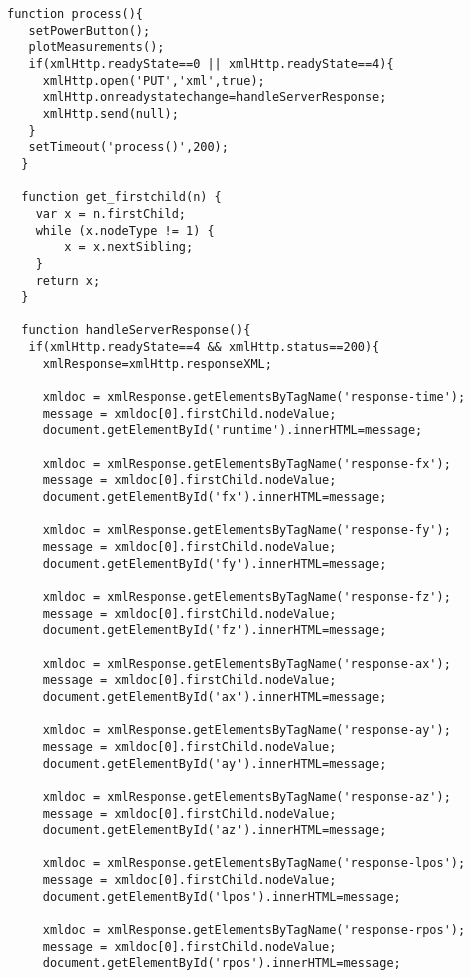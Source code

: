 \documentclass[a4paper,12pt,twoside,openany]{report}
\begin{document}
\begin{lstlisting}[style=customhtml]
  function process(){
   setPowerButton();
   plotMeasurements();
   if(xmlHttp.readyState==0 || xmlHttp.readyState==4){
     xmlHttp.open('PUT','xml',true);
     xmlHttp.onreadystatechange=handleServerResponse;
     xmlHttp.send(null);
   }
   setTimeout('process()',200);
  }
  
  function get_firstchild(n) {
    var x = n.firstChild;
    while (x.nodeType != 1) {
        x = x.nextSibling;
    }
    return x;
  }
  
  function handleServerResponse(){
   if(xmlHttp.readyState==4 && xmlHttp.status==200){
     xmlResponse=xmlHttp.responseXML;
  
     xmldoc = xmlResponse.getElementsByTagName('response-time');
     message = xmldoc[0].firstChild.nodeValue;
     document.getElementById('runtime').innerHTML=message;

     xmldoc = xmlResponse.getElementsByTagName('response-fx');
     message = xmldoc[0].firstChild.nodeValue;
     document.getElementById('fx').innerHTML=message;

     xmldoc = xmlResponse.getElementsByTagName('response-fy');
     message = xmldoc[0].firstChild.nodeValue;
     document.getElementById('fy').innerHTML=message;

     xmldoc = xmlResponse.getElementsByTagName('response-fz');
     message = xmldoc[0].firstChild.nodeValue;
     document.getElementById('fz').innerHTML=message;

     xmldoc = xmlResponse.getElementsByTagName('response-ax');
     message = xmldoc[0].firstChild.nodeValue;
     document.getElementById('ax').innerHTML=message;

     xmldoc = xmlResponse.getElementsByTagName('response-ay');
     message = xmldoc[0].firstChild.nodeValue;
     document.getElementById('ay').innerHTML=message;

     xmldoc = xmlResponse.getElementsByTagName('response-az');
     message = xmldoc[0].firstChild.nodeValue;
     document.getElementById('az').innerHTML=message;

     xmldoc = xmlResponse.getElementsByTagName('response-lpos');
     message = xmldoc[0].firstChild.nodeValue;
     document.getElementById('lpos').innerHTML=message;

     xmldoc = xmlResponse.getElementsByTagName('response-rpos');
     message = xmldoc[0].firstChild.nodeValue;
     document.getElementById('rpos').innerHTML=message;


\end{lstlisting}
\end{document}
